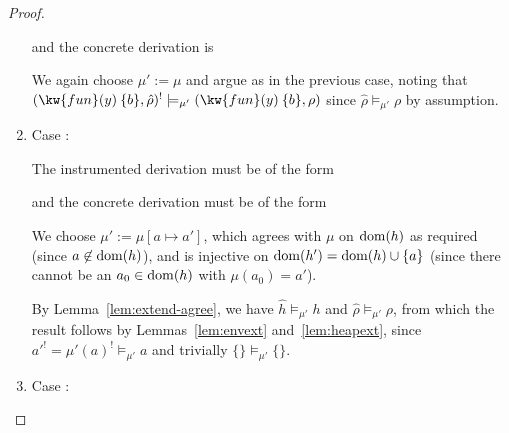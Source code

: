\documentclass{article}
\begin{document}
\begin{proof}
\begin{enumerate}
  \begin{prooftree}
  \end{prooftree}

  and the concrete derivation is

  \begin{prooftree}
  \end{prooftree}

  We again choose $\mu':=\mu$ and argue as in the previous case, noting that $(\kw{fun}(y)\>\{b\},\hat{\rho})^!\models_{\mu'}(\kw{fun}(y)\>\{b\},\rho)$ since $\hat{\rho}\models_{\mu'}\rho$ by assumption.
\item Case :

  The instrumented derivation must be of the form
  
  \begin{prooftree}
     
     
  \end{prooftree}

  and the concrete derivation must be of the form

  \begin{prooftree}
     
  \end{prooftree}

  We choose $\mu':=\mu[a\mapsto a']$, which agrees with $\mu$ on $\dom(h)$ as required (since $a\not\in\dom(h)$), and is injective on $\dom(h')=\dom(h)\cup\{a\}$ (since there cannot be an $a_0\in\dom(h)$ with $\mu(a_0)=a'$).

  By Lemma~\ref{lem:extend-agree}, we have $\hat{h}\models_{\mu'}h$ and $\hat{\rho}\models_{\mu'}\rho$, from which the result follows by Lemmas~\ref{lem:envext} and~\ref{lem:heapext}, since $a'^!=\mu'(a)^!\models_{\mu'}a$ and trivially $\{\}\models_{\mu'}\{\}$.
\item Case :


\end{enumerate}
\end{proof}
\end{document}

